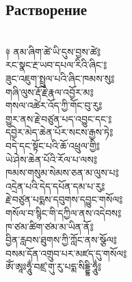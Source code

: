 \subsection{Растворение}
\\
\ti
༈ ནམ་ཞིག་ཚེ་ཡི་དུས་བྱས་ཚེ༔\\
རང་སྣང་རྔ་ཡབ་དཔལ་རིའི་ཞིང་༔\\
ཟུང་འཇུག་སྤྲུལ་པའི་ཞིང་ཁམས་སུ༔\\
གཞི་ལུས་རྡོ་རྗེ་རྣལ་འབྱོར་མ༔\\
གསལ་འཚེར་འོད་ཀྱི་གོང་བུ་རུ༔\\
གྱུར་ནས་རྗེ་བཙུན་པད་འབྱུང་དང་༔\\
དབྱེར་མེད་ཆེན་པོར་སངས་རྒྱས་ཏེ༔\\
བདེ་དང་སྟོང་པའི་ཆོ་འཕྲུལ་གྱི༔\\
ཡེ་ཤེས་ཆེན་པོའི་རོལ་པ་ལས༔\\
ཁམས་གསུམ་སེམས་ཅན་མ་ལུས་པ༔\\
འདྲེན་པའི་དེད་དཔོན་དམ་པ་རུ༔\\
རྗེ་བཙུན་པདྨས་དབུགས་དབྱུང་གསོལ༔\\
གསོལ་བ་སྙིང་གི་དཀྱིལ་ནས་འདེབས༔\\
ཁ་ཙམ་ཚིག་ཙམ་མ་ཡིན་ནོ༔\\
བྱིན་རླབས་ཐུགས་ཀྱི་ཀློང་ནས་སྩོལ༔\\
བསམ་དོན་འགྲུབ་པར་མཛད་དུ་གསོལ༔\\
ཨོཾ་ཨཱཿཧཱུྂ་བཛྲ་གུ་རུ་པདྨ་སིདྡྷི་ཧཱུྂ༔\\
\ru


